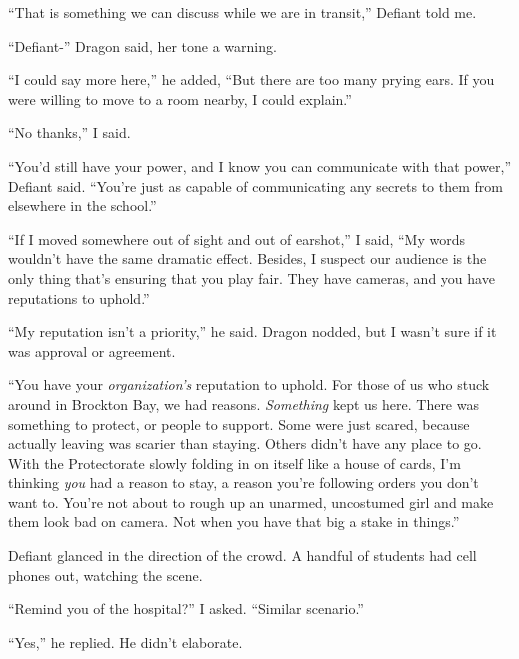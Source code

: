 ``That is something we can discuss while we are in transit,'' Defiant told me.



``Defiant-'' Dragon said, her tone a warning.



``I could say more here,'' he added, ``But there are too many prying ears.  If you were willing to move to a room nearby, I could explain.''



``No thanks,'' I said.



``You'd still have your power, and I know you can communicate with that power,'' Defiant said.  ``You're just as capable of communicating any secrets to them from elsewhere in the school.''



``If I moved somewhere out of sight and out of earshot,'' I said, ``My words wouldn't have the same dramatic effect.  Besides, I suspect our audience is the only thing that's ensuring that you play fair.  They have cameras, and you have reputations to uphold.''



``My reputation isn't a priority,'' he said.  Dragon nodded, but I wasn't sure if it was approval or agreement.



``You have your \emph{organization's} reputation to uphold.  For those of us who stuck around in Brockton Bay, we had reasons.  \emph{Something }kept us here.  There was something to protect, or people to support.  Some were just scared, because actually leaving was scarier than staying.  Others didn't have any place to go.  With the Protectorate slowly folding in on itself like a house of cards, I'm thinking \emph{you} had a reason to stay, a reason you're following orders you don't want to.  You're not about to rough up an unarmed, uncostumed girl and make them look bad on camera.  Not when you have that big a stake in things.''



Defiant glanced in the direction of the crowd.  A handful of students had cell phones out, watching the scene.



``Remind you of the hospital?'' I asked.  ``Similar scenario.''



``Yes,'' he replied.  He didn't elaborate.



